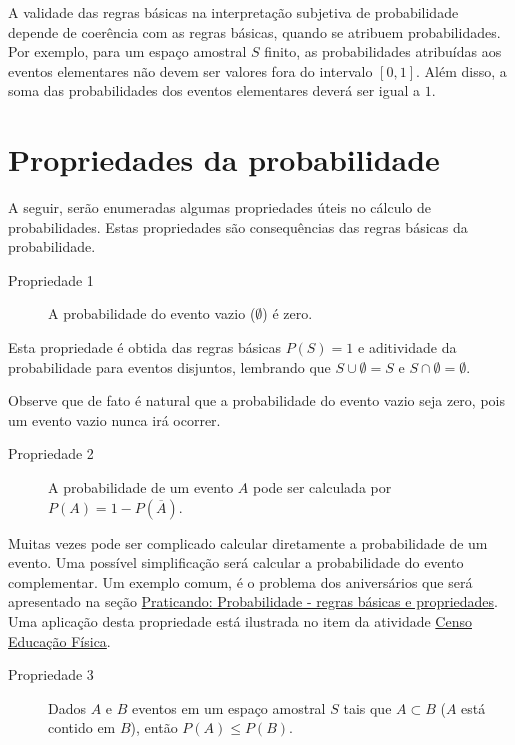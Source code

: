 A validade das regras básicas na interpretação subjetiva de probabilidade depende de coerência com as regras básicas, quando se atribuem probabilidades. Por exemplo, para um espaço amostral \(S\) finito, as probabilidades atribuídas aos eventos elementares não devem ser valores fora do intervalo \([0,1]\). Além disso, a soma das probabilidades dos eventos elementares deverá ser igual a $1$.


\section{Propriedades da probabilidade}

A seguir, serão enumeradas algumas propriedades úteis no cálculo de probabilidades. Estas propriedades são consequências das regras básicas da probabilidade.

\begin{description}
\item[Propriedade 1] A probabilidade do evento vazio (\(\emptyset\)) é zero.
\end{description}

Esta propriedade é obtida das regras básicas \(P(S)=1\) e aditividade da probabilidade para eventos disjuntos, lembrando que \(S\cup \emptyset =S\) e \(S\cap \emptyset =\emptyset\).

Observe que de fato é natural que a probabilidade do evento vazio seja zero, pois um evento vazio nunca irá ocorrer.

\begin{description}
\item[Propriedade 2] A probabilidade de um evento \(A\) pode ser calculada por \(P({A})= 1-P(\overline{A})\).
\end{description}

Muitas vezes pode ser complicado calcular diretamente a probabilidade de um evento. Uma possível simplificação será calcular a probabilidade do evento complementar. Um exemplo comum, é o problema dos aniversários que será apresentado na seção \hyperref[regrasbasicaspropriedades]{Praticando: Probabilidade - regras básicas e propriedades}. Uma aplicação desta propriedade está ilustrada no item  da atividade \hyperref[censo-educacao-fisica]{Censo Educação Física}.

\begin{description}
\item[Propriedade 3] Dados \(A\) e \(B\) eventos em um espaço amostral \(S\) tais que \(A\subset B\) (\(A\) está contido em \(B\)), então \(P(A)\leq P(B)\).
\end{description}

